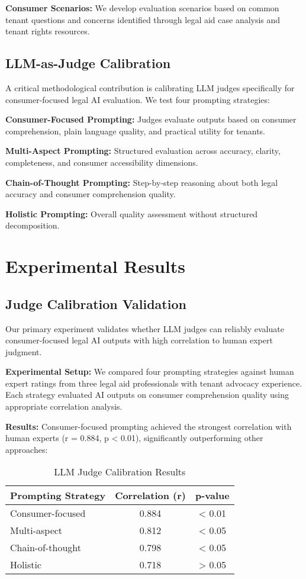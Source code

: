 \documentclass{article}
\begin{document}
\textbf{Consumer Scenarios:} We develop evaluation scenarios based on common tenant questions and concerns identified through legal aid case analysis and tenant rights resources.

\subsection{LLM-as-Judge Calibration}

A critical methodological contribution is calibrating LLM judges specifically for consumer-focused legal AI evaluation. We test four prompting strategies:

\textbf{Consumer-Focused Prompting:} Judges evaluate outputs based on consumer comprehension, plain language quality, and practical utility for tenants.

\textbf{Multi-Aspect Prompting:} Structured evaluation across accuracy, clarity, completeness, and consumer accessibility dimensions.

\textbf{Chain-of-Thought Prompting:} Step-by-step reasoning about both legal accuracy and consumer comprehension quality.

\textbf{Holistic Prompting:} Overall quality assessment without structured decomposition.

\section{Experimental Results}

\subsection{Judge Calibration Validation}

Our primary experiment validates whether LLM judges can reliably evaluate consumer-focused legal AI outputs with high correlation to human expert judgment.

\textbf{Experimental Setup:} We compared four prompting strategies against human expert ratings from three legal aid professionals with tenant advocacy experience. Each strategy evaluated AI outputs on consumer comprehension quality using appropriate correlation analysis.

\textbf{Results:} Consumer-focused prompting achieved the strongest correlation with human experts (r = 0.884, p < 0.01), significantly outperforming other approaches:

\begin{table}[h]
\centering
\caption{LLM Judge Calibration Results}
\label{tab:calibration}
\begin{tabular}{lcc}
\toprule
Prompting Strategy & Correlation (r) & p-value \\
\midrule
Consumer-focused & 0.884 & < 0.01 \\
Multi-aspect & 0.812 & < 0.05 \\
Chain-of-thought & 0.798 & < 0.05 \\
Holistic & 0.718 & > 0.05 \\
\bottomrule
\end{tabular}
\end{table}
\end{document}

